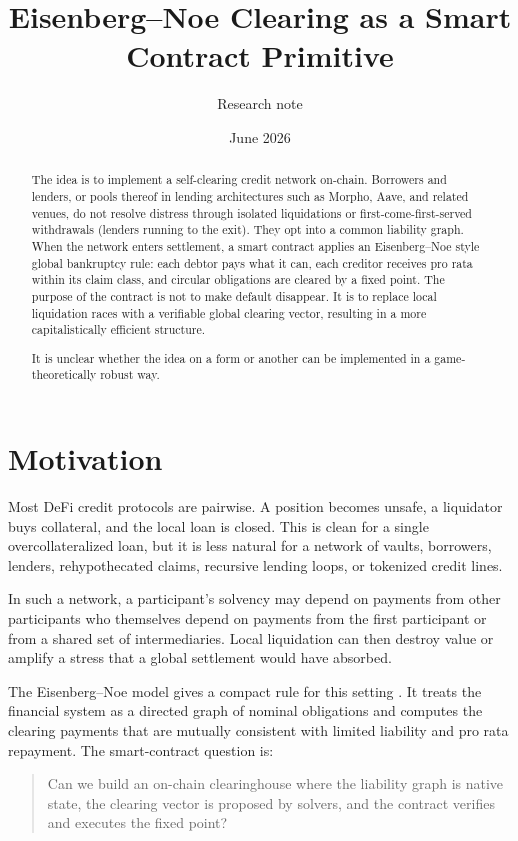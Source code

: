 \documentclass[11pt,oneside]{article}
\title{Eisenberg--Noe Clearing as a Smart Contract Primitive}
\author{Research note}
\date{June 2026}
\begin{document}
\maketitle

\begin{abstract}
The idea is to implement a self-clearing credit network on-chain.
Borrowers and lenders, or pools thereof in lending architectures such as
Morpho, Aave, and related venues, do not resolve distress through isolated
liquidations or first-come-first-served withdrawals (lenders running to the
exit). They opt into a common liability graph.
When the network enters settlement, a smart contract applies an
Eisenberg--Noe style global bankruptcy rule: each debtor pays what it can, each
creditor receives pro rata within its claim class, and circular obligations are
cleared by a fixed point. The purpose of the contract is not to make default
disappear. It is to replace local liquidation races with a verifiable global
clearing vector, resulting in a more capitalistically efficient structure.

It is unclear whether the idea on a form or another
can be implemented in a game-theoretically robust way.
\end{abstract}

\section{Motivation}

Most DeFi credit protocols are pairwise. A position becomes unsafe, a liquidator
buys collateral, and the local loan is closed. This is clean for a single
overcollateralized loan, but it is less natural for a network of vaults,
borrowers, lenders, rehypothecated claims, recursive lending loops, or tokenized
credit lines.

In such a network, a participant's solvency may depend on payments from other
participants who themselves depend on payments from the first participant or
from a shared set of intermediaries. Local liquidation can then destroy value
or amplify a stress that a global settlement would have absorbed.

The Eisenberg--Noe model gives a compact rule for this setting
\cite{eisenberg2001systemic}. It treats the financial system as a directed
graph of nominal obligations and computes the clearing payments that are
mutually consistent with limited liability and pro rata repayment. The
smart-contract question is:

\begin{quote}
Can we build an on-chain clearinghouse where the liability graph is native
state, the clearing vector is proposed by solvers, and the contract verifies
and executes the fixed point?
\end{quote}
\end{document}
